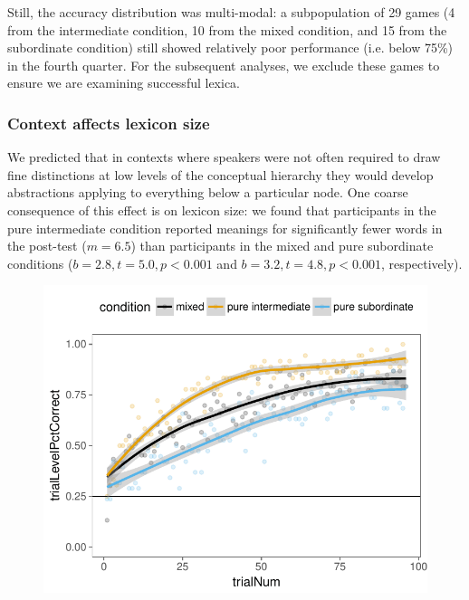 \documentclass[10pt,letterpaper]{article}
\begin{document}
Still, the accuracy distribution was multi-modal: a subpopulation of 29 games (4 from the intermediate condition, 10 from the mixed condition, and 15 from the subordinate condition) still showed relatively poor  performance (i.e. below 75\%) in the fourth quarter. For the subsequent analyses, we exclude these games to ensure we are examining successful lexica.

\subsubsection{Context affects lexicon size}

We predicted that in contexts where speakers were not often required to draw fine distinctions at low levels of the conceptual hierarchy they would develop abstractions applying to everything below a particular node. One coarse consequence of this effect is on lexicon size: we found that participants in the pure intermediate condition reported meanings for significantly fewer words in the post-test ($m = 6.5$) than participants in the mixed and pure subordinate conditions ($b = 2.8, t = 5.0, p <0.001$ and $b = 3.2, t = 4.8, p < 0.001$, respectively). 

\begin{figure}[t]
\begin{center}
{\includegraphics[scale=0.6]{accuracyByCondition.pdf}}
{\caption{{\footnotesize {}   \label{fig:accuracy}}}}
\end{center}
\end{figure}
\end{document}
